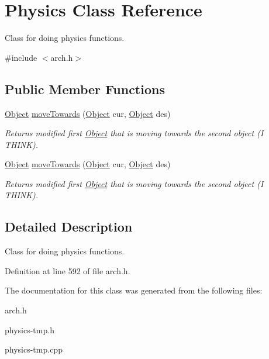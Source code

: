 \hypertarget{classPhysics}{}\section{Physics Class Reference}
\label{classPhysics}


Class for doing physics functions.  




{\ttfamily \#include $<$arch.\+h$>$}

\subsection*{Public Member Functions}
\begin{DoxyCompactItemize}
\item 
\hyperlink{classObject}{Object} \hyperlink{classPhysics_a8e53f9bf088c0d4f208b3c2029d69ab2}{move\+Towards} (\hyperlink{classObject}{Object} cur, \hyperlink{classObject}{Object} des)\hypertarget{classPhysics_a8e53f9bf088c0d4f208b3c2029d69ab2}{}\label{classPhysics_a8e53f9bf088c0d4f208b3c2029d69ab2}

\begin{DoxyCompactList}\small\item\em Returns modified first \hyperlink{classObject}{Object} that is moving towards the second object (I T\+H\+I\+NK). \end{DoxyCompactList}\item 
\hyperlink{classObject}{Object} \hyperlink{classPhysics_a8e53f9bf088c0d4f208b3c2029d69ab2}{move\+Towards} (\hyperlink{classObject}{Object} cur, \hyperlink{classObject}{Object} des)\hypertarget{classPhysics_a8e53f9bf088c0d4f208b3c2029d69ab2}{}\label{classPhysics_a8e53f9bf088c0d4f208b3c2029d69ab2}

\begin{DoxyCompactList}\small\item\em Returns modified first \hyperlink{classObject}{Object} that is moving towards the second object (I T\+H\+I\+NK). \end{DoxyCompactList}\end{DoxyCompactItemize}


\subsection{Detailed Description}
Class for doing physics functions. 

Definition at line 592 of file arch.\+h.



The documentation for this class was generated from the following files\+:\begin{DoxyCompactItemize}
\item 
arch.\+h\item 
physics-\/tmp.\+h\item 
physics-\/tmp.\+cpp\end{DoxyCompactItemize}

